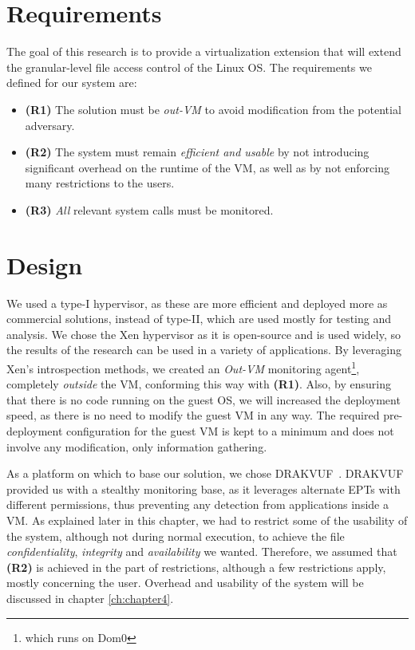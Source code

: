 \section{Requirements}\label{sec:requirements}
The goal of this research is to provide a virtualization extension that will extend the granular-level file access control of the Linux \ac{OS}. The requirements we defined for our system are:
\begin{itemize}
	\item \textbf{(R1)} The solution must be \emph{out-\ac{VM}} to avoid modification from the potential adversary. 
	\item \textbf{(R2)} The system must remain \emph{efficient and usable} by not introducing significant overhead on the runtime of the \ac{VM}, as well as by not enforcing many restrictions to the users. 
	\item \textbf{(R3)} \emph{All} relevant system calls must be monitored.
\end{itemize}


\section{Design}\label{sec:design}

\par We used a type-I hypervisor, as these are more efficient and deployed more as commercial solutions, instead of type-II, which are used mostly for testing and analysis. We chose the Xen hypervisor as it is open-source and is used widely, so the results of the research can be used in a variety of applications. By leveraging Xen's introspection methods, we created an \emph{Out-VM} monitoring agent\footnote{which runs on Dom0}, completely \emph{outside} the \ac{VM}, conforming this way with \textbf{(R1)}. Also, by ensuring that there is no code running on the guest \ac{OS}, we will increased the deployment speed, as there is no need to modify the guest \ac{VM} in any way. The required pre-deployment configuration for the guest \ac{VM} is kept to a minimum and does not involve any modification, only information gathering.

\par As a platform on which to base our solution, we chose DRAKVUF~\cite{lengyel2014drakvuf}. DRAKVUF provided us with a stealthy monitoring base, as it leverages alternate \ac{EPT}s with different permissions, thus preventing any detection from applications inside a \ac{VM}. As explained later in this chapter, we had to restrict some of the usability of the system, although not during normal execution, to achieve the file \emph{confidentiality}, \emph{integrity} and \emph{availability} we wanted. Therefore, we assumed that \textbf{(R2)} is achieved in the part of restrictions, although a few restrictions apply, mostly concerning the  user. Overhead and usability of the system will be discussed in chapter \ref{ch:chapter4}.

